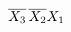 \documentclass[preview]{standalone}
\begin{document}
\begin{align*}
\overline{X_3}\nobreak\hspace{.16667em plus .08333em}\overline{X_2}X_1
\end{align*}
\end{document}
